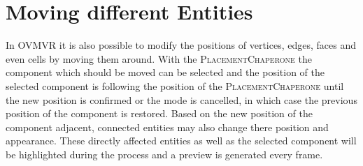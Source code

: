 \documentclass{report}
\begin{document}
	\section{Moving different Entities}
	\startsection
		In OVMVR it is also possible to modify the positions of vertices, edges, faces and even cells by moving them around. With the \textsc{PlacementChaperone} the component which should be moved can be selected and the position of the selected component is following the position of the \textsc{PlacementChaperone} until the new position is confirmed or the mode is cancelled, in which case the previous position of the component is restored. Based on the new position of the component adjacent, connected entities may also change there position and appearance. These directly affected entities as well as the selected component will be highlighted during the process and a preview is generated every frame.
\end{document}
